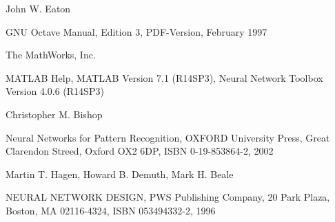 




%

\begin{thebibliography}{XXXXXXX}

 John W. Eaton

GNU Octave Manual, Edition 3, PDF-Version, February 1997

 The MathWorks, Inc.

MATLAB Help, MATLAB Version 7.1 (R14SP3), Neural Network Toolbox Version 4.0.6 (R14SP3) 

 Christopher M. Bishop

Neural Networks for Pattern Recognition, OXFORD University Press, Great Clarendon Streed, Oxford OX2 6DP,
ISBN 0-19-853864-2, 2002

 Martin T. Hagen, Howard B. Demuth, Mark H. Beale

NEURAL NETWORK DESIGN, PWS Publishing Company, 20 Park Plaza, Boston, MA 02116-4324, ISBN 053494332-2, 1996

\end{thebibliography}
%